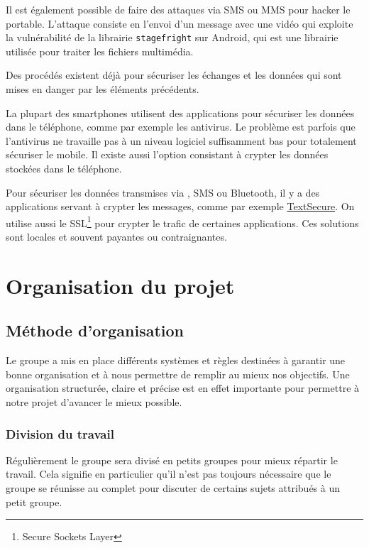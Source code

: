 \documentclass[a4paper, 12pt,twoside]{article}
\begin{document}
	Il est également possible de faire des attaques via SMS ou MMS pour hacker le portable. L'attaque consiste en l'envoi d'un message avec une vidéo qui exploite la vulnérabilité de la librairie \verb!stagefright! sur Android, qui est une librairie utilisée pour traiter les fichiers multimédia.

	Des procédés existent déjà pour sécuriser les échanges et les données qui sont mises en danger par les éléments précédents.
	
	La plupart des smartphones utilisent des applications pour sécuriser les données dans le téléphone, comme par exemple les antivirus. Le problème est parfois que l'antivirus ne travaille pas à un niveau logiciel suffisamment bas pour totalement sécuriser le mobile. Il existe aussi l'option consistant à crypter les données stockées dans le téléphone.
	
	Pour sécuriser les données transmises via \wifi{}, SMS ou \newcommand{\bluetooth}{Bluetooth} \bluetooth{}, il y a des applications servant à crypter les messages, comme par exemple \href{http://www.whispersystems.org/#encrypted_texts}{TextSecure}. On utilise aussi le SSL\footnote{Secure Sockets Layer} pour crypter le trafic de certaines applications. Ces solutions sont locales et souvent payantes ou contraignantes.


\section{Organisation du projet}

	\subsection{Méthode d'organisation}
	
	Le groupe a mis en place différents systèmes et règles destinées à garantir une bonne organisation et à nous permettre de remplir au mieux nos objectifs. Une organisation structurée, claire et précise est en effet importante pour permettre à notre projet d'avancer le mieux possible.
		
		\subsubsection{Division du travail}
		
		Régulièrement le groupe sera divisé en petits groupes pour mieux répartir le travail. Cela signifie en particulier qu'il n'est pas toujours nécessaire que le groupe se réunisse au complet pour discuter de certains sujets attribués à un petit groupe.
		
\end{document}
